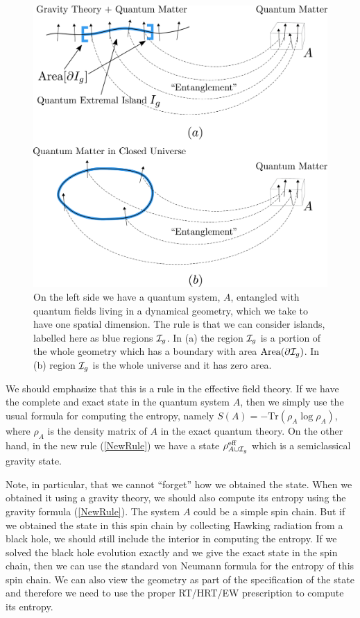\documentclass[12pt]{article}
\def\nref#1{(\ref{#1})}
\begin{document}
 
\begin{figure}[ht]
    \begin{center}
    \includegraphics[scale=.17]{Figures/Pockets.pdf}
    \end{center}
    \caption{On the left side we have a quantum system, $A$, entangled with quantum fields living in a dynamical geometry, which we take to have one spatial dimension.  The rule is that we can consider islands, labelled here as blue regions ${\cal I}_g$. In (a) the region ${\cal I}_g$ is a portion of the whole geometry which has a boundary with area $\text{Area}(\partial {\cal I}_g)$. In (b) region ${\cal I}_g$ is the whole universe and it has zero area.}
    \label{islands}
\end{figure}

We should emphasize that this is a rule in the effective field theory. 
If we have the complete and exact state in the quantum system $A$, then we simply use the usual formula for computing the entropy, namely $S(A) = - \text{Tr}(\rho_A \log \rho_A)$, where $\rho_A$ is the density matrix of $A$ in the exact quantum theory.
On the other hand, in the new rule \nref{NewRule} we have a state $\rho^{\rm eff}_{A \cup {{\cal I}_g}}$ which is a semiclassical gravity state.

Note,  in  particular, that we cannot ``forget'' how we obtained the state. 
When we obtained it using a gravity theory, we should also compute its entropy using the gravity formula \nref{NewRule}. 
The system $A$ could be a simple spin chain. 
But if we obtained the state in this spin chain by collecting Hawking radiation from a black hole, we should still include the interior in computing the entropy. 
If we solved the black hole evolution exactly and we give the exact state in the spin chain, then we can use the standard von Neumann formula for the entropy of this spin chain. 
We can also view the geometry as part of the specification of the state and therefore we need to use the proper RT/HRT/EW prescription to compute its entropy. 
\end{document}
